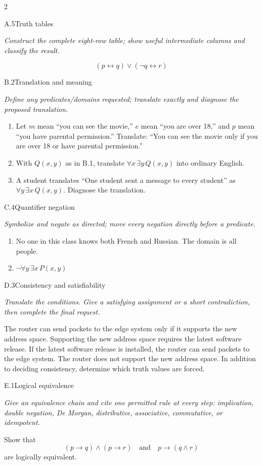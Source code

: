 \documentclass[9pt]{extarticle}
\begin{document}
\begin{multicols}{2}
\begin{CoreProblem}{A.5}{Truth tables}
{\scriptsize\textit{Construct the complete eight-row table; show useful intermediate columns and classify the result.}\par}
\[
  (p\leftrightarrow q)\lor(\neg q\leftrightarrow r)
\]
\end{CoreProblem}
\begin{CoreProblem}{B.2}{Translation and meaning}
{\scriptsize\textit{Define any predicates/domains requested; translate exactly and diagnose the proposed translation.}\par}
\begin{enumerate}[label=(\alph*)]
  \item Let $m$ mean ``you can see the movie,'' $e$ mean ``you are over 18,''
        and $p$ mean ``you have parental permission.'' Translate: ``You can
        see the movie only if you are over 18 or have parental permission.''
  \item With $Q(x,y)$ as in B.1, translate $\forall x\,\exists y\,Q(x,y)$
        into ordinary English.
  \item A student translates ``One student sent a message to every student''
        as $\forall y\,\exists x\,Q(x,y)$. Diagnose the translation.
\end{enumerate}
\end{CoreProblem}
\begin{CoreProblem}{C.4}{Quantifier negation}
{\scriptsize\textit{Symbolize and negate as directed; move every negation directly before a predicate.}\par}
\begin{enumerate}[label=(\alph*)]
  \item No one in this class knows both French and Russian. The domain is all
        people.
  \item $\neg\forall y\,\exists x\,P(x,y)$
\end{enumerate}
\end{CoreProblem}
\columnbreak
\begin{CoreProblem}{D.3}{Consistency and satisfiability}
{\scriptsize\textit{Translate the conditions. Give a satisfying assignment or a short contradiction, then complete the final request.}\par}
The router can send packets to the edge system only if it supports the new
address space. Supporting the new address space requires the latest software
release. If the latest software release is installed, the router can send
packets to the edge system. The router does not support the new address space.
In addition to deciding consistency, determine which truth values are forced.
\end{CoreProblem}
\begin{CoreProblem}{E.1}{Logical equivalence}
{\scriptsize\textit{Give an equivalence chain and cite one permitted rule at every step: implication, double negation, De Morgan, distributive, associative, commutative, or idempotent.}\par}
Show that
\[
  (p\to q)\land(p\to r)
  \quad\text{and}\quad
  p\to(q\land r)
\]
are logically equivalent.
\end{CoreProblem}
\end{multicols}
\end{document}
